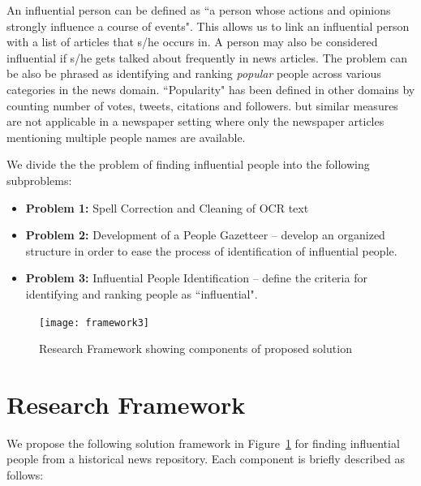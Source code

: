  An influential person can be defined as ``a person whose actions and opinions strongly influence a course of events". This allows us to link an influential person with a list of articles that s/he occurs in.
 A person may also be considered influential if s/he gets talked about frequently in news articles. The problem can be also be phrased as identifying and ranking \emph{popular} people across various categories in the news domain. 
 ``Popularity" has been defined in other domains by counting number of votes, tweets, citations and followers. \cite{cheng2014can} but similar measures are not applicable in a newspaper setting where only the newspaper articles mentioning multiple people names are available.  
 
We divide the the problem of finding influential people into the following subproblems:
\begin{itemize}
\item \textbf{Problem 1: } Spell Correction and Cleaning of OCR text
\item \textbf{Problem 2: } Development of a People Gazetteer -- develop an organized structure in order to ease the process of identification of influential people.
\item \textbf{Problem 3: } Influential People Identification -- define the criteria for identifying and ranking people as ``influential".
\end{itemize}
  
\begin{figure}[h]
\centering
\texttt{[image: framework3]}
\caption{Research Framework showing components of proposed solution}
\label{fig:framework}
\end{figure} 

\section {Research Framework}

We propose the following solution framework in Figure~\ref{fig:framework} for finding influential people from a historical news repository. Each component is briefly described as follows:

